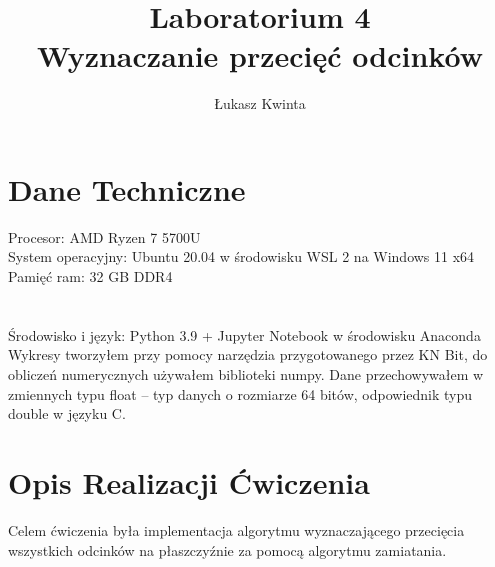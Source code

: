 \documentclass[a4paper]{article}
\title{\fontsize{30pt}{30pt}\selectfont Laboratorium 4 \\ Wyznaczanie przecięć odcinków}
\author{\fontsize{20pt}{20pt}\selectfont Łukasz Kwinta}
\date{}
\begin{document}
\maketitle
\Large
\vspace*{\fill}
\section{Dane Techniczne}
Procesor: AMD Ryzen 7 5700U\\
System operacyjny: Ubuntu 20.04 w środowisku WSL 2 na Windows 11 x64\\
Pamięć ram: 32 GB DDR4\\
\\
\\
Środowisko i język: Python 3.9 + Jupyter Notebook w środowisku Anaconda\\
Wykresy tworzyłem przy pomocy narzędzia przygotowanego przez KN Bit, 
do obliczeń numerycznych używałem biblioteki numpy.
 Dane przechowywałem w zmiennych typu float – typ danych o rozmiarze 64 bitów, 
 odpowiednik typu double w języku C.
\pagebreak
\section{Opis Realizacji Ćwiczenia}
Celem ćwiczenia była implementacja algorytmu wyznaczającego przecięcia wszystkich odcinków
na płaszczyźnie za pomocą algorytmu zamiatania.
\end{document}

